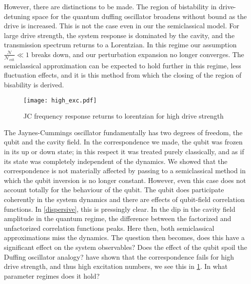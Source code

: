 However, there are distinctions to be made.
The region of bistability in drive-detuning space for the quantum duffing oscillator broadens without bound as the drive is increased. 
This is not the case even in our the semiclassical model. 
For large drive strength, the system response is dominated by the cavity, and the transmission spectrum returns to a Lorentzian.  
In this regime our assumption $\frac{\mathscr{N}}{\mathscr{N}_\text{crit}} \ll 1$ breaks down, and our perturbation expansion no longer converges. 
The semiclassical approximation can be expected to hold further in this regime\cite{Bishop2010}, less fluctuation effects, and it is this method from which the closing of the region of bisability is derived. 
\begin{figure}[bht]
  \centering
  \texttt{[image: high\_exc.pdf]}
  \caption{JC frequency response returns to lorentzian for high drive strength}
  \label{high_exc}
\end{figure}
The Jaynes-Cummings oscillator fundamentally has two degrees of freedom, the qubit and the cavity field. 
In the correspondence we made, the qubit was frozen in its up or down state; in this respect it was treated purely classically, and as if its state was completely independent of the dynamics. 
We showed that the correspondence is not materially affected by passing to a semiclassical method in which the qubit inversion is no longer constant.
However, even this case does not account totally for the behaviour of the qubit.
The qubit does participate coherently in the system dynamics and there are effects of qubit-field correlation functions.
In \cref{dispersive}, this is pressingly clear. 
In the dip in the cavity field amplitude in the quantum regime, the difference between the factorized and unfactorized correlation functions peaks.
Here then, both semiclassical approximations miss the dynamics.
The question then becomes, does this have a significant effect on the system observables? 
Does the effect of the qubit spoil the Duffing oscillator analogy?
\cite{Bishop2010} have shown that the correspondence fails for high drive strength, and thus high excitation numbers, we see this in \cref{high_exc}.
In what parameter regimes does it hold?
